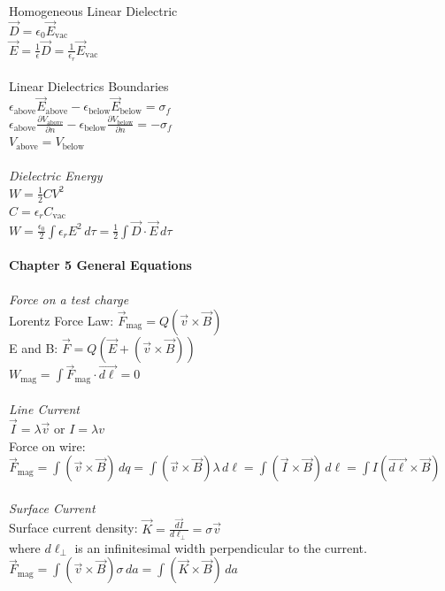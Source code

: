 \documentclass[12pt]{article}
\newcommand{\ds}{\displaystyle}
\begin{document}
\begin{flushleft}
Homogeneous Linear Dielectric\\
$\vec{D}=\epsilon_0\vec{E}_\text{vac}$\\
$\ds \vec{E}=\frac{1}{\epsilon}\vec{D}=\frac{1}{\epsilon_r}\vec{E}_\text{vac}$\\~\\

Linear Dielectrics Boundaries\\
$\ds \epsilon_\text{above}\vec{E}_\text{above}-\epsilon_\text{below}\vec{E}_\text{below}=\sigma_f$\\
$\ds \epsilon_\text{above}\frac{\partial V_\text{above}}{\partial n}-\epsilon_\text{below}\frac{\partial V_\text{below}}{\partial n}=-\sigma_f$\\
$V_\text{above}=V_\text{below}$\\~\\

\textit{Dielectric Energy}\\
$\ds W=\frac{1}{2}CV^2$\\
$\ds C=\epsilon_rC_\text{vac}$\\
$\ds W=\frac{\epsilon_0}{2}\int\epsilon_rE^2\,d\tau=\frac{1}{2}\int\vec{D}\cdot\vec{E}\,d\tau$\\~\\


\textbf{Chapter 5 General Equations}\\~\\
\textit{Force on a test charge}\\
Lorentz Force Law: $\ds \vec{F}_\text{mag}=Q(\vec{v}\times\vec{B})$\\
E and B: $\ds \vec{F}=Q(\vec{E}+(\vec{v}\times\vec{B}))$\\
$W_\text{mag}=\int\vec{F}_\text{mag}\cdot\vec{d\ell}=0$\\~\\

\textit{Line Current}\\
$\vec{I}=\lambda\vec{v}$ or $I=\lambda v$\\
Force on wire: $\ds \vec{F}_\text{mag}=\int(\vec{v}\times\vec{B})\,dq=\int(\vec{v}\times\vec{B})\lambda\,d\ell=\int(\vec{I}\times\vec{B})\,d\ell=\int I(\vec{d\ell}\times\vec{B})$\\~\\

\textit{Surface Current}\\
Surface current density: $\ds\vec{K}=\frac{\vec{dI}}{d\ell_\perp}=\sigma\vec{v}$\\
where $d\ell_\perp$ is an infinitesimal width perpendicular to the current.\\
$\ds\vec{F}_\text{mag}=\int(\vec{v}\times\vec{B})\sigma\,da=\int(\vec{K}\times\vec{B})\,da$\\~\\


\end{flushleft}
\end{document}

